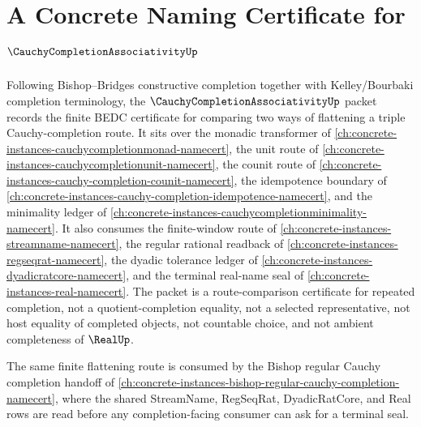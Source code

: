 \chapter{A Concrete Naming Certificate for $\CauchyCompletionAssociativityUp$}
\label{ch:concrete-instances-cauchy-completion-associativity-namecert}

Following Bishop--Bridges constructive completion together with Kelley/Bourbaki completion terminology, the $\CauchyCompletionAssociativityUp$ packet records the finite BEDC certificate for comparing two ways of flattening a triple Cauchy-completion route. It sits over the monadic transformer of \autoref{ch:concrete-instances-cauchycompletionmonad-namecert}, the unit route of \autoref{ch:concrete-instances-cauchycompletionunit-namecert}, the counit route of \autoref{ch:concrete-instances-cauchy-completion-counit-namecert}, the idempotence boundary of \autoref{ch:concrete-instances-cauchy-completion-idempotence-namecert}, and the minimality ledger of \autoref{ch:concrete-instances-cauchycompletionminimality-namecert}. It also consumes the finite-window route of \autoref{ch:concrete-instances-streamname-namecert}, the regular rational readback of \autoref{ch:concrete-instances-regseqrat-namecert}, the dyadic tolerance ledger of \autoref{ch:concrete-instances-dyadicratcore-namecert}, and the terminal real-name seal of \autoref{ch:concrete-instances-real-namecert}. The packet is a route-comparison certificate for repeated completion, not a quotient-completion equality, not a selected representative, not host equality of completed objects, not countable choice, and not ambient completeness of $\RealUp$.

The same finite flattening route is consumed by the Bishop regular Cauchy completion handoff of \autoref{ch:concrete-instances-bishop-regular-cauchy-completion-namecert}, where the shared StreamName, RegSeqRat, DyadicRatCore, and Real rows are read before any completion-facing consumer can ask for a terminal seal.

